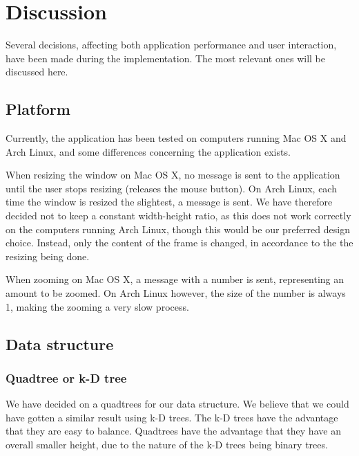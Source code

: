 \documentclass[a4paper,11pt]{article}
\begin{document}
\pagebreak
\section{Discussion} %
\label{sec:Discussion} %
Several decisions, affecting both application performance and user interaction, have been made during the implementation. The most relevant ones will be discussed here.

\subsection{Platform} %
Currently, the application has been tested on computers running Mac OS X and Arch Linux, and some differences concerning the application exists.

When resizing the window on Mac OS X, no message is sent to the application until the user stops resizing (releases the mouse button). On Arch Linux, each time the window is resized the slightest, a message is sent. We have therefore decided not to keep a constant width-height ratio, as this does not work correctly on the computers running Arch Linux, though this would be our preferred design choice. Instead, only the content of the frame is changed, in accordance to the the resizing being done.

When zooming on Mac OS X, a message with a number is sent, representing an amount to be zoomed. On Arch Linux however, the size of the number is always 1, making the zooming a very slow process.

\subsection{Data structure} %

\subsubsection{Quadtree or k-D tree} %
We have decided on a quadtrees for our data structure. We believe that we could have gotten a similar result using k-D trees. The k-D trees have the advantage that they are easy to balance. Quadtrees have the advantage that they have an overall smaller height, due to the nature of the k-D trees being binary trees.
\end{document}
